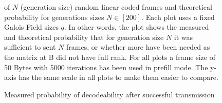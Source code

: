 \documentclass[a4paper,english,10pt]{tumarticle}
\begin{document}
\begin{figure}[htb]
  \hfill
  of $N$ (generation size) random linear coded frames and theoretical
  probability for generations sizes $N\in[200]$. Each plot uses a fixed Galois
  Field sizes $q$. In other words, the plot shows the measured and theoretical
  probability that for generation size $N$ it was sufficient to sent $N$ frames,
  or whether more have been needed as the matrix at B did not have full rank.
  For all plots a frame size of 50 Bytes with 5000 iterations has been used in
  prefill mode. The y-axis has the same scale in all plots to make them easier to
  compare.
  \label{fig:gfs}
  \caption{Measured probability of decodeability after successful transmission}
\end{figure}





\end{document}
